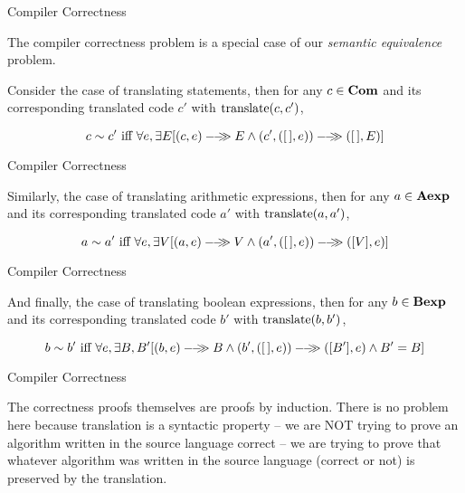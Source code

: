 \documentclass{beamer}
\begin{document}
\begin{frame}[fragile]{Compiler Correctness}

\small
The compiler correctness problem is a special case of our 
{\em semantic equivalence} problem.

\vspace{.1in}
Consider the case of translating statements, then for any $c\in\mbox{\bf Com}$
and its corresponding translated code $c'$ with ${\rm translate}(c,c')$,

\vspace{.1in}
{\scriptsize
\[
c \sim c' \mbox{ iff }\forall e,\exists E[\sem{(c,e)}{E} \wedge 
	\sem{(c',([\, ],e))}{([\, ],E)}]
\]
}
\end{frame}


\begin{frame}[fragile]{Compiler Correctness}

\small
Similarly,  the case of translating arithmetic expressions, then for any $a\in\mbox{\bf Aexp}$
and its corresponding translated code $a'$ with ${\rm translate}(a,a')$,

\vspace{.1in}
{\scriptsize
\[
a \sim a' \mbox{ iff } \forall e,\exists V[\sem{(a,e)}{V} \wedge 
	\sem{(a',([\, ],e))}{([ V ],e)}]
\]
}
\end{frame}


\begin{frame}[fragile]{Compiler Correctness}

\small
And finally,  the case of translating boolean expressions, then for any $b\in\mbox{\bf Bexp}$
and its corresponding translated code $b'$ with ${\rm translate}(b,b')$,

\vspace{.1in}
{\scriptsize
\[
b \sim b' \mbox{ iff } \forall e,\exists B, B' [\sem{(b,e)}{B} \wedge 
	\sem{(b',([\, ],e))}{([ B' ],e)} \wedge
	 B'  = B]
\]
}
\end{frame}

\begin{frame}[fragile]{Compiler Correctness}

\small
The correctness proofs themselves are proofs by induction.  
There is no problem here because translation is a syntactic property -- we are NOT trying to 
prove an algorithm written in the source language correct -- we are trying to prove that whatever
algorithm was written in the source language (correct or not) is preserved by the translation.

\end{frame}
\end{document}
